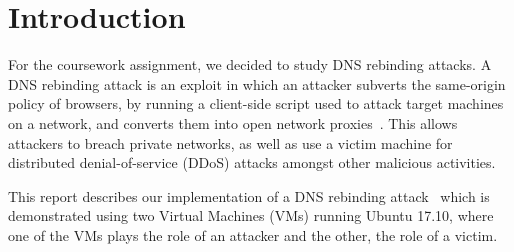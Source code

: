 \chapter{Introduction}

For the coursework assignment, we decided to study DNS rebinding attacks.
A DNS rebinding attack is an exploit in which an attacker subverts
the same-origin policy of browsers, by running a client-side script used to
attack target machines on a network, and converts them into open network
proxies~\cite{jackson2009protecting}. This allows attackers to
breach private networks, as well as use a victim machine for distributed
denial-of-service (DDoS) attacks amongst other malicious activities.

\vspace{0.5cm}

This report describes our implementation of a DNS rebinding
attack~\cite{cve20185702} which is demonstrated using two
Virtual Machines (VMs) running Ubuntu 17.10, where one of the VMs plays the
role
of an attacker and the other, the role of a victim.
